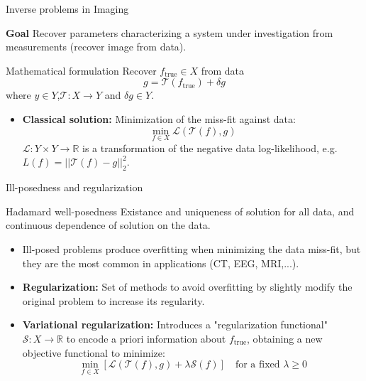 \begin{frame}{Inverse problems in Imaging}
\begin{block}{\textbf{Goal}}
Recover parameters characterizing a system under investigation from measurements (recover image from data).
\end{block}
\pause
\bigskip

\begin{block}{Mathematical formulation}
Recover $f_{\text{true}}\in X$ from data
$$
g = \mathcal{T}(f_{\text{true}})+\delta g
$$
where $y\in Y$,$\mathcal{T}:X\longrightarrow Y$ and $\delta g\in Y$.
\end{block}

\pause
\bigskip

\begin{itemize}
\item \textbf{Classical solution:} 
Minimization of the miss-fit against data:
$$
\min_{f\in X}\mathcal{L}(\mathcal{T}(f),g)
$$
$\mathcal{L}:Y\times Y\longrightarrow \mathbb{R}$ is a transformation of the negative data log-likelihood, e.g. $L(f)=||\mathcal{T}(f)-g||_2^2$.
\end{itemize}
\end{frame}

\begin{frame}{Ill-posedness and regularization}


\begin{block}{Hadamard well-posedness}
 Existance and uniqueness of solution for all data, and continuous dependence of solution on the data.
\end{block}

\bigskip
\pause
\begin{itemize}
\item Ill-posed problems produce overfitting when minimizing the data miss-fit, but they are the most common in applications (CT, EEG, MRI,...).

\bigskip
\pause
\item \textbf{Regularization:} Set of methods to avoid overfitting by slightly modify the original problem to increase its regularity.

\bigskip
\pause
\item \textbf{Variational regularization:} Introduces a "regularization functional" $\mathcal{S}:X\longrightarrow \mathbb{R}$ to encode a priori information about $f_{\text{true}}$, obtaining a new objective functional to minimize:
$$
\min_{f\in X}\left[\mathcal{L}(\mathcal{T}(f),g)+\lambda \mathcal{S}(f)\right]\quad \text{for a fixed $\lambda\geq 0$}
$$

\end{itemize}
\end{frame}


